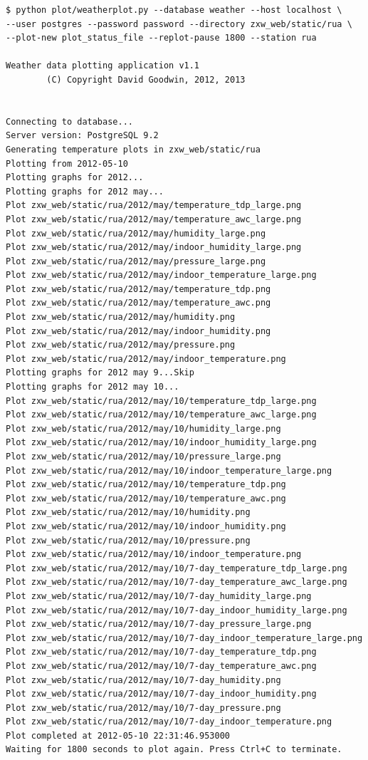 \documentclass[a4paper,10pt,draft]{book}
\begin{document}
\begin{verbatim}
$ python plot/weatherplot.py --database weather --host localhost \
--user postgres --password password --directory zxw_web/static/rua \
--plot-new plot_status_file --replot-pause 1800 --station rua

Weather data plotting application v1.1
        (C) Copyright David Goodwin, 2012, 2013


Connecting to database...
Server version: PostgreSQL 9.2
Generating temperature plots in zxw_web/static/rua
Plotting from 2012-05-10
Plotting graphs for 2012...
Plotting graphs for 2012 may...
Plot zxw_web/static/rua/2012/may/temperature_tdp_large.png
Plot zxw_web/static/rua/2012/may/temperature_awc_large.png
Plot zxw_web/static/rua/2012/may/humidity_large.png
Plot zxw_web/static/rua/2012/may/indoor_humidity_large.png
Plot zxw_web/static/rua/2012/may/pressure_large.png
Plot zxw_web/static/rua/2012/may/indoor_temperature_large.png
Plot zxw_web/static/rua/2012/may/temperature_tdp.png
Plot zxw_web/static/rua/2012/may/temperature_awc.png
Plot zxw_web/static/rua/2012/may/humidity.png
Plot zxw_web/static/rua/2012/may/indoor_humidity.png
Plot zxw_web/static/rua/2012/may/pressure.png
Plot zxw_web/static/rua/2012/may/indoor_temperature.png
Plotting graphs for 2012 may 9...Skip
Plotting graphs for 2012 may 10...
Plot zxw_web/static/rua/2012/may/10/temperature_tdp_large.png
Plot zxw_web/static/rua/2012/may/10/temperature_awc_large.png
Plot zxw_web/static/rua/2012/may/10/humidity_large.png
Plot zxw_web/static/rua/2012/may/10/indoor_humidity_large.png
Plot zxw_web/static/rua/2012/may/10/pressure_large.png
Plot zxw_web/static/rua/2012/may/10/indoor_temperature_large.png
Plot zxw_web/static/rua/2012/may/10/temperature_tdp.png
Plot zxw_web/static/rua/2012/may/10/temperature_awc.png
Plot zxw_web/static/rua/2012/may/10/humidity.png
Plot zxw_web/static/rua/2012/may/10/indoor_humidity.png
Plot zxw_web/static/rua/2012/may/10/pressure.png
Plot zxw_web/static/rua/2012/may/10/indoor_temperature.png
Plot zxw_web/static/rua/2012/may/10/7-day_temperature_tdp_large.png
Plot zxw_web/static/rua/2012/may/10/7-day_temperature_awc_large.png
Plot zxw_web/static/rua/2012/may/10/7-day_humidity_large.png
Plot zxw_web/static/rua/2012/may/10/7-day_indoor_humidity_large.png
Plot zxw_web/static/rua/2012/may/10/7-day_pressure_large.png
Plot zxw_web/static/rua/2012/may/10/7-day_indoor_temperature_large.png
Plot zxw_web/static/rua/2012/may/10/7-day_temperature_tdp.png
Plot zxw_web/static/rua/2012/may/10/7-day_temperature_awc.png
Plot zxw_web/static/rua/2012/may/10/7-day_humidity.png
Plot zxw_web/static/rua/2012/may/10/7-day_indoor_humidity.png
Plot zxw_web/static/rua/2012/may/10/7-day_pressure.png
Plot zxw_web/static/rua/2012/may/10/7-day_indoor_temperature.png
Plot completed at 2012-05-10 22:31:46.953000
Waiting for 1800 seconds to plot again. Press Ctrl+C to terminate.
\end{verbatim}
\end{document}
